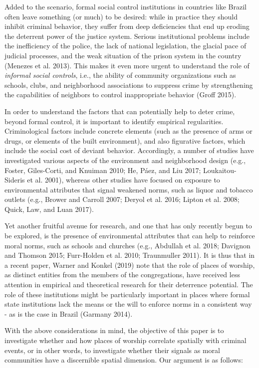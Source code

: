 \documentclass[smallextended]{svjour3}       %
\begin{document}
Added to the scenario, formal social control institutions in countries
like Brazil often leave something (or much) to be desired: while in
practice they should inhibit criminal behavior, they suffer from deep
deficiencies that end up eroding the deterrent power of the justice
system. Serious institutional problems include the inefficiency of the
police, the lack of national legislation, the glacial pace of judicial
processes, and the weak situation of the prison system in the country
(Menezes et al. 2013). This makes it even more urgent to understand the
role of \emph{informal social controls}, i.e., the ability of community
organizations such as schools, clubs, and neighborhood associations to
suppress crime by strengthening the capabilities of neighbors to control
inappropriate behavior (Groff 2015).

In order to understand the factors that can potentially help to deter
crime, beyond formal control, it is important to identify empirical
regularities. Criminological factors include concrete elements (such as
the presence of arms or drugs, or elements of the built environment),
and also figurative factors, which include the social cost of deviant
behavior. Accordingly, a number of studies have investigated various
aspects of the environment and neighborhood design (e.g., Foster,
Giles-Corti, and Knuiman 2010; He, Páez, and Liu 2017; Loukaitou-Sideris
et al. 2001), whereas other studies have focused on exposure to
environmental attributes that signal weakened norms, such as liquor and
tobacco outlets (e.g., Brower and Carroll 2007; Deryol et al. 2016;
Lipton et al. 2008; Quick, Law, and Luan 2017).

Yet another fruitful avenue for research, and one that has only recently
begun to be explored, is the presence of environmental attributes that
can help to reinforce moral norms, such as schools and churches (e.g.,
Abdullah et al. 2018; Davignon and Thomson 2015; Furr-Holden et al.
2010; Traunmuller 2011). It is thus that in a recent paper, Warner and
Konkel (2019) note that the role of places of worship, as distinct
entities from the members of the congregations, have received less
attention in empirical and theoretical research for their deterrence
potential. The role of these institutions might be particularly
important in places where formal state institutions lack the means or
the will to enforce norms in a consistent way - as is the case in Brazil
(Garmany 2014).

With the above considerations in mind, the objective of this paper is to
investigate whether and how places of worship correlate spatially with
criminal events, or in other words, to investigate whether their signals
as moral communities have a discernible spatial dimension. Our argument
is as follows:
\end{document}
